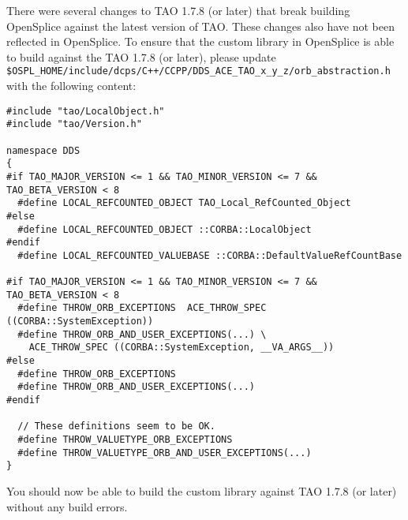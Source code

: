 There were several changes to TAO 1.7.8 (or later) that break
building OpenSplice against the latest version of TAO. These
changes also have not been reflected in OpenSplice. To ensure
that the custom library in OpenSplice is able to build against
the TAO 1.7.8 (or later), please update 
\texttt{\$OSPL\_HOME/include/dcps/C++/CCPP/DDS\_ACE\_TAO\_x\_y\_z/orb\_abstraction.h}
with the following content:
\begin{lstlisting}
#include "tao/LocalObject.h"
#include "tao/Version.h"

namespace DDS
{
#if TAO_MAJOR_VERSION <= 1 && TAO_MINOR_VERSION <= 7 && TAO_BETA_VERSION < 8
  #define LOCAL_REFCOUNTED_OBJECT TAO_Local_RefCounted_Object
#else
  #define LOCAL_REFCOUNTED_OBJECT ::CORBA::LocalObject
#endif
  #define LOCAL_REFCOUNTED_VALUEBASE ::CORBA::DefaultValueRefCountBase

#if TAO_MAJOR_VERSION <= 1 && TAO_MINOR_VERSION <= 7 && TAO_BETA_VERSION < 8
  #define THROW_ORB_EXCEPTIONS  ACE_THROW_SPEC ((CORBA::SystemException))
  #define THROW_ORB_AND_USER_EXCEPTIONS(...) \
    ACE_THROW_SPEC ((CORBA::SystemException, __VA_ARGS__))
#else
  #define THROW_ORB_EXCEPTIONS
  #define THROW_ORB_AND_USER_EXCEPTIONS(...)
#endif

  // These definitions seem to be OK.
  #define THROW_VALUETYPE_ORB_EXCEPTIONS
  #define THROW_VALUETYPE_ORB_AND_USER_EXCEPTIONS(...)
}
\end{lstlisting}
You should now be able to build the custom library against 
TAO 1.7.8 (or later) without any build errors.